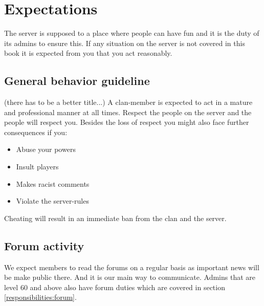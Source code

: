 \chapter{Expectations}
The server is supposed to a place where people can have fun and it is the duty of its admins to ensure this. If any situation on the server is not covered in this book it is expected from you that you act reasonably.

\section{General behavior guideline}
\label{expectations:general}
(there has to be a better title...)
A clan-member is expected to act in a mature and professional manner at all times. Respect the people on the server and the people will respect you. Besides the loss of respect you might also face further consequences if you:

\begin{itemize}
  \item Abuse your powers
  \item Insult players
  \item Makes racist comments
	\item Violate the server-rules
\end{itemize}

Cheating will result in an immediate ban from the clan and the server.

\section{Forum activity}
We expect members to read the forums on a regular basis as important news will be make public there. And it is our main way to communicate. Admins that are level 60 and above also have forum duties which are covered in section \ref{responsibilities:forum}.


